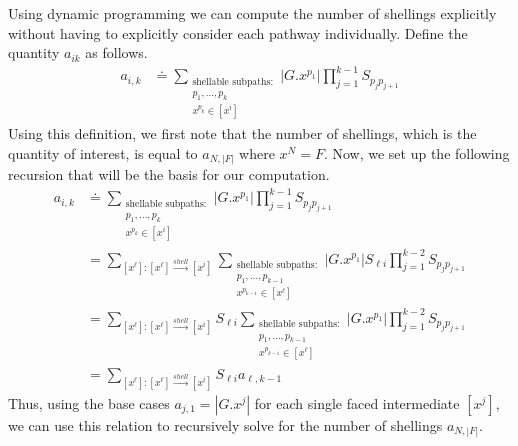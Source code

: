 Using dynamic programming we can compute the number of shellings explicitly without having to explicitly consider each pathway individually. Define the quantity $a_{ik}$ as follows.
\begin{align}
a_{i,k} &\doteq  \sum_{\substack{\text{shellable subpaths}:\\ p_1, \dots, p_k \\ x^{p_k} \in [x^i]}}|G.x^{p_1}|\prod_{j=1}^{k-1}S_{p_j p_{j+1}} \end{align}
Using this definition, we first note that the number of shellings, which is the quantity of interest, is equal to $a_{N,|F|}$ where $x^N = F$. Now, we set up the following recursion that will be the basis for our computation. 
\begin{align}
a_{i,k} &\doteq \sum_{\substack{\text{shellable subpaths}:\\ p_1, \dots, p_k \\ x^{p_k} \in [x^i]}}|G.x^{p_1}|\prod_{j=1}^{k-1}S_{p_j p_{j+1}} \\  
&= \sum_{[x^\ell]:[x^\ell]\xrightarrow{shell}[x^i]} \sum_{\substack{\text{shellable subpaths}:\\ p_1, \dots, p_{k-1} \\ x^{p_{k-1}} \in [x^\ell]}}|G.x^{p_1}|S_{\ell i}\prod_{j=1}^{k-2}S_{p_j p_{j+1}} \\
&= \sum_{[x^\ell]:[x^\ell]\xrightarrow{shell}[x^i]} S_{\ell i} \sum_{\substack{\text{shellable subpaths}:\\ p_1, \dots, p_{k-1} \\ x^{p_{k-1}} \in [x^\ell]}}|G.x^{p_1}|\prod_{j=1}^{k-2}S_{p_j p_{j+1}} \\
&= \sum_{[x^\ell]:[x^\ell]\xrightarrow{shell}[x^i]} S_{\ell i} a_{\ell, k-1}
\end{align}
Thus, using the base cases $a_{j,1} = |G.x^j|$ for each single faced intermediate $[x^j]$, we can use this relation to recursively solve for the number of shellings $a_{N,|F|}$.

